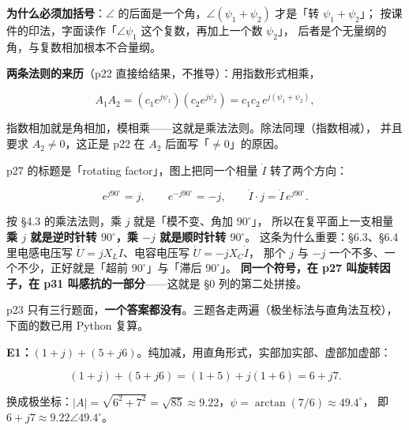 \documentclass[11pt]{ctexart}
\begin{document}

\textbf{为什么必须加括号}：$\angle$ 的后面是一个角，$\angle(\psi_1+\psi_2)$ 才是「转 $\psi_1+\psi_2$」；
按课件的印法，字面读作「$\angle\psi_1$ 这个复数，再加上一个数 $\psi_2$」，
后者是个无量纲的角，与复数相加根本不合量纲。

\textbf{两条法则的来历}（p22 直接给结果，不推导）：用指数形式相乘，

\[ A_1A_2=\left(c_1e^{j\psi_1}\right)\left(c_2e^{j\psi_2}\right)
   =c_1c_2\,e^{j(\psi_1+\psi_2)} , \]

指数相加就是角相加，模相乘——这就是乘法法则。除法同理（指数相减），
并且要求 $A_2\ne0$，这正是 p22 在 $A_2$ 后面写「$\ne0$」的原因。


p27 的标题是「rotating factor」，图上把同一个相量 $\dot I$ 转了两个方向：

\[ e^{j90^\circ}=j ,\qquad e^{-j90^\circ}=-j ,\qquad
   \dot I\cdot j=\dot I\,e^{j90^\circ} . \]

按 §4.3 的乘法法则，乘 $j$ 就是「模不变、角加 $90^\circ$」，
所以在复平面上一支相量\textbf{乘 $j$ 就是逆时针转 $90^\circ$，乘 $-j$ 就是顺时针转 $90^\circ$}。
这条为什么重要：§6.3、§6.4 里电感电压写 $\dot U=jX_L\dot I$、电容电压写 $\dot U=-jX_C\dot I$，
那个 $j$ 与 $-j$ 一个不多、一个不少，正好就是「超前 $90^\circ$」与「滞后 $90^\circ$」。
\textbf{同一个符号，在 p27 叫旋转因子，在 p31 叫感抗的一部分}——这就是 §0 列的第二处拼接。



p23 只有三行题面，\textbf{一个答案都没有}。三题各走两遍（极坐标法与直角法互校），
下面的数已用 Python 复算。

\textbf{E1：$(1+j)+(5+j6)$}。纯加减，用直角形式，实部加实部、虚部加虚部：

\[ (1+j)+(5+j6)=(1+5)+j(1+6)=6+j7 . \]

换成极坐标：$|A|=\sqrt{6^2+7^2}=\sqrt{85}\approx9.22$，$\psi=\arctan(7/6)\approx49.4^\circ$，
即 $6+j7\approx9.22\angle49.4^\circ$。
\end{document}
